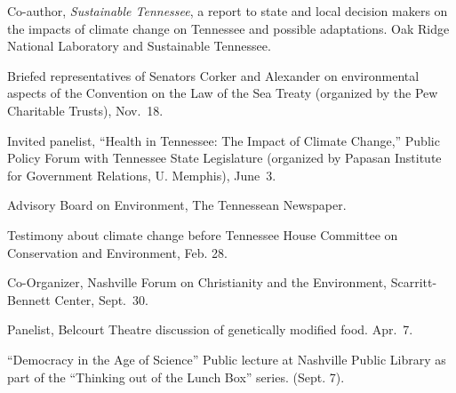 \item[2011--2012] Co-author, \emph{Sustainable Tennessee}, a report to state
  and local decision makers on the impacts of climate change on Tennessee and
  possible adaptations. Oak Ridge National Laboratory and Sustainable Tennessee.
\item[2009] Briefed representatives of Senators Corker and Alexander on
  environmental aspects of the Convention on the Law of the Sea Treaty
  (organized by the Pew Charitable Trusts), Nov.~18.
\item[2009] Invited panelist, ``Health in Tennessee: The Impact of Climate
  Change,'' Public Policy Forum with Tennessee State Legislature (organized by
  Papasan Institute for Government Relations, U. Memphis), June~3.
\item[2007--2009] Advisory Board on Environment, The Tennessean Newspaper.
\item[2008] Testimony about climate change before Tennessee House Committee on
  Conservation and Environment, Feb. 28.
\item[2006] Co-Organizer, Nashville Forum on Christianity and the Environment,
  Scarritt-Bennett Center, Sept.~30.
\item[2006] Panelist, Belcourt Theatre discussion of genetically modified food.
  Apr.~7.
\item[2005] ``Democracy in the Age of Science'' Public lecture at Nashville
  Public Library as part of the ``Thinking out of the Lunch Box'' series.
  (Sept. 7).
